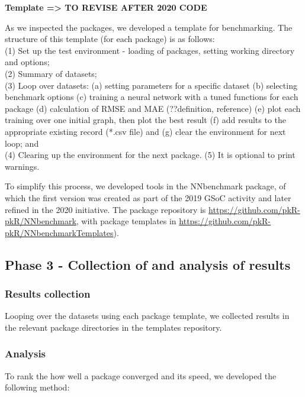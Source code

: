 \textbf{Template =\textgreater{} TO REVISE AFTER 2020 CODE}

As we inspected the packages, we developed a template for benchmarking.
The structure of this template (for each package) is as follows:\\
(1) Set up the test environment - loading of packages, setting working
directory and options;\\
(2) Summary of datasets;\\
(3) Loop over datasets: (a) setting parameters for a specific dataset
(b) selecting benchmark options (c) training a neural network with a
tuned functions for each package (d) calculation of RMSE and MAE
(??definition, reference) (e) plot each training over one initial graph,
then plot the best result (f) add results to the appropriate existing
record (*.csv file) and (g) clear the environment for next loop; and\\
(4) Clearing up the environment for the next package. (5) It is optional
to print warnings.

To simplify this process, we developed tools in the NNbenchmark package,
of which the first version was created as part of the 2019 GSoC activity
and later refined in the 2020 initiative. The package repository is
\url{https://github.com/pkR-pkR/NNbenchmark}, with package templates in
\url{https://github.com/pkR-pkR/NNbenchmarkTemplates}).

\hypertarget{phase-3---collection-of-and-analysis-of-results}{%
\subsection{Phase 3 - Collection of and analysis of
results}\label{phase-3---collection-of-and-analysis-of-results}}

\hypertarget{results-collection}{%
\subsubsection{Results collection}\label{results-collection}}

Looping over the datasets using each package template, we collected
results in the relevant package directories in the templates repository.

\hypertarget{analysis}{%
\subsubsection{Analysis}\label{analysis}}

To rank the how well a package converged and its speed, we developed the
following method:

